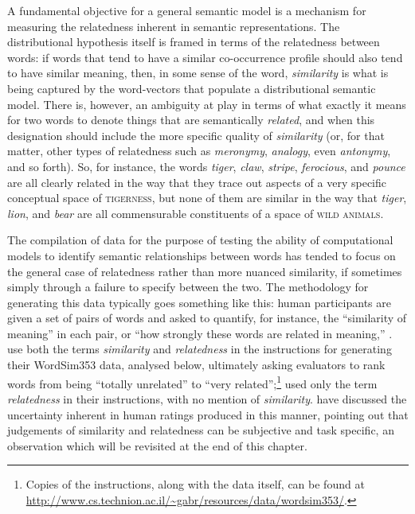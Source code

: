 A fundamental objective for a general semantic model is a mechanism for measuring the relatedness inherent in semantic representations.  The distributional hypothesis itself is framed in terms of the relatedness between words: if words that tend to have a similar co-occurrence profile should also tend to have similar meaning, then, in some sense of the word, \emph{similarity} is what is being captured by the word-vectors that populate a distributional semantic model.  There is, however, an ambiguity at play in terms of what exactly it means for two words to denote things that are semantically \emph{related}, and when this designation should include the more specific quality of \emph{similarity} (or, for that matter, other types of relatedness such as \emph{meronymy}, \emph{analogy}, even \emph{antonymy}, and so forth).  So, for instance, the words \emph{tiger}, \emph{claw}, \emph{stripe}, \emph{ferocious}, and \emph{pounce} are all clearly related in the way that they trace out aspects of a very specific conceptual space of \textsc{tigerness}, but none of them are similar in the way that \emph{tiger}, \emph{lion}, and \emph{bear} are all commensurable constituents of a space of \textsc{wild animals}.

The compilation of data for the purpose of testing the ability of computational models to identify semantic relationships between words has tended to focus on the general case of relatedness rather than more nuanced similarity, if sometimes simply through a failure to specify between the two.  The methodology for generating this data typically goes something like this: human participants are given a set of pairs of words and asked to quantify, for instance, the ``similarity of meaning'' \citep[][p. 628]{RubensteinEA1965} in each pair, or ``how strongly these words are related in meaning,'' \citep[][p. 124]{YangEA2006}.  \cite{FinkelsteinEA2002} use both the terms \emph{similarity} and \emph{relatedness} in the instructions for generating their WordSim353 data, analysed below, ultimately asking evaluators to rank words from being ``totally unrelated'' to ``very related'';\footnote{Copies of the instructions, along with the data itself, can be found at \url{http://www.cs.technion.ac.il/~gabr/resources/data/wordsim353/}.} \cite{BruniEA2012} used only the term \emph{relatedness} in their instructions, with no mention of \emph{similarity}.  \cite{FaruquiEA2016} have discussed the uncertainty inherent in human ratings produced in this manner, pointing out that judgements of similarity and relatedness can be subjective and task specific, an observation which will be revisited at the end of this chapter.

